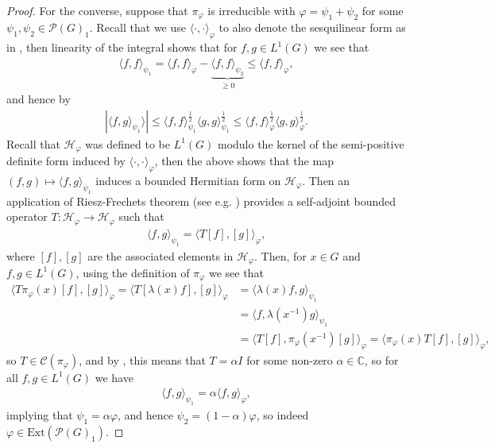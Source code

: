 \documentclass[10pt,twoside,openany,final]{memoir}
\theoremstyle{definition}
\theoremstyle{Break}
\newcommand{\C}{\mathbb{C}}
\renewcommand{\H}{\mathcal{H}}
\begin{document}
\begin{proof}
	For the converse, suppose that $\pi_\varphi$ is irreducible with $\varphi=\psi_1+\psi_2$ for some $\psi_1,\psi_2 \in \mathcal{P}(G)_1$. Recall that we use $\langle \cdot, \cdot \rangle_\varphi$ to also denote the sesquilinear form as in , then linearity of the integral shows that for $f,g \in L^1(G)$ we see that
	\begin{align*}
		\langle f,f \rangle_{\psi_1} = \langle f,f \rangle_{\varphi}- \underbrace{\langle f,f \rangle_{\psi_2}}_{\geq 0} \leq \langle f, f \rangle_{\varphi},
	\end{align*}
	and hence by 
	\begin{align*}
		|\langle f,g \rangle_{\psi_1}\rangle| \leq \langle f,f \rangle_{\psi_1}^{\frac{1}{2}} \langle g,g \rangle_{\psi_1}^{\frac{1}{2}}\leq \langle f,f \rangle_\varphi ^{\frac{1}{2}} \langle g,g \rangle_\varphi^{\frac{1}{2}}.
	\end{align*}
	Recall that $\H_\varphi$ was defined to be $L^1(G)$ modulo the kernel of the semi-positive definite form induced by $\langle \cdot , \cdot \rangle_\varphi$, then the above shows that the map $(f,g) \mapsto \langle f,g \rangle_{\psi_1}$ induces a bounded Hermitian form on $\H_\varphi$. Then an application of Riesz-Frechets theorem (see e.g. \cite[5-6]{blackadar2006operator}) provides a self-adjoint bounded operator $T \colon \H_\varphi \to \H_\varphi$ such that 
	\begin{align*}
		\langle f,g \rangle_{\psi_1} = \langle T [f],[g]\rangle_{\varphi},
	\end{align*}
	where $[f],[g]$ are the associated elements in $\H_\varphi$. Then, for $x \in G$ and $f,g \in L^1(G)$, using the definition of $\pi_\varphi$ we see that
	\begin{align*}
		\langle T \pi_\varphi (x) [f],[g] \rangle_\varphi = \langle T [\lambda(x) f] , [g] \rangle_\varphi &= \langle \lambda(x) f,g \rangle_{\psi_1} \\
		&= \langle f , \lambda(x^{-1}) g \rangle_{\psi_1}\\
		&= \langle T [f] , \pi_\varphi(x^{-1}) [g] \rangle_{\varphi} = \langle \pi_{\varphi}(x)T [f],[g] \rangle_\varphi,
	\end{align*}
	so $T \in \mathcal{C}(\pi_\varphi)$, and by , this means that $T=\alpha I$ for some non-zero $\alpha \in \C$, so for all $f,g \in L^1(G)$ we have
	\begin{align*}
		\langle f,g \rangle_{\psi_1}= \alpha \langle f,g \rangle_\varphi,
	\end{align*}
	implying that $\psi_1 = \alpha \varphi$, and hence $\psi_2 = (1-\alpha) \varphi$, so indeed $\varphi \in \mathrm{Ext}(\mathcal{P}(G)_1)$.
\end{proof}	
\end{document}
